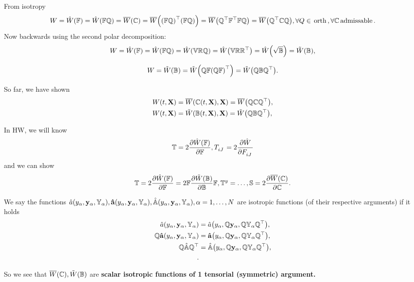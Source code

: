 \documentclass[reqno, a4paper]{article}
\begin{document}
From isotropy
\[
	W = \hat{W}\qty(\mathbb{F}) = \hat{W}\qty(\mathbb{F} \mathbb{Q}) = \overline{W}\qty(\mathbb{C}) = \overline{W}\qty(\qty(\mathbb{F} \mathbb{Q})^\top \qty(\mathbb{F} \mathbb{Q})) = \overline{W}\qty(\mathbb{Q}^\top \mathbb{F}^\top\mathbb{F} \mathbb{Q}) = \overline{W}\qty(\mathbb{Q}^\top\mathbb{C} \mathbb{Q}), \forall Q \in \, \text{orth} \,, \forall \mathbb{C} \, \text{admissable} \,.
\]
Now backwards using the second polar decomposition:
\[
	W = \hat{W}\qty(\mathbb{F}) = \hat{W}\qty(\mathbb{F} \mathbb{Q}) = \hat{W}\qty(\mathbb{V}\mathbb{R}\mathbb{Q}) = \hat{W}\qty(\mathbb{V}\mathbb{R}\mathbb{R}^\top) = \hat{W}\qty(\sqrt{\mathbb{B}}) = \tilde{W}\qty(\mathbb{B}),
\]

\[
	W = \tilde{W}\qty(\mathbb{B}) = \tilde{W}\qty(\mathbb{Q}\mathbb{F} \qty(\mathbb{Q}\mathbb{F})^\top) = \tilde{W}\qty(\mathbb{Q}\mathbb{B} \mathbb{Q}^\top).
\]

So far, we have shown
\begin{align*}
	W\qty(t,\vb{X}) &= \overline{W}\qty(\mathbb{C}\qty(t,\vb{X}),\vb{X}) = \overline{W}\qty(\mathbb{Q}\mathbb{C} \mathbb{Q}^\top), \\ W\qty(t,\vb{X}) &= \tilde{W}\qty(\mathbb{B}(t,\vb{X}), \vb{X}) = \tilde{W}\qty(\mathbb{Q} \mathbb{B} \mathbb{Q}^\top),
\end{align*}

In HW, we will know
\[
	\pkstress = 2 \pdv{\hat{W}\qty(\fgrad)}{\fgrad}, T \indices{_{iJ}} = 2 \pdv{\hat{W}}{F \indices{_{iJ}}}
\]
and we can show
\[
	\mathbb{T} = 2\pdv{\hat{W}\qty(\ensuremath{\mathbb{F}})}{\ensuremath{\mathbb{F}}} = 2 \mathbb{F} \pdv{\tilde{W}\qty(\ensuremath{\mathbb{B}})}{\ensuremath{\mathbb{B}}}\mathbb{F}, \mathbb{T}^y  = \dots, \mathbb{S} = 2 \pdv{\overline{W}\qty(\ensuremath{\mathbb{C}})}{\ensuremath{\mathbb{C}}}.
\]

\begin{definition}
	We say the functions $\hat{a}\qty(y_{\alpha}, \vb{y}_{\alpha}, \mathbb{Y}_{\alpha}), \vb{\hat{a}}\qty(y_{\alpha}, \vb{y}_{\alpha}, \mathbb{Y}_{\alpha}), \hat{\mathbb{A}}\qty(y_{\alpha},\vb{y}_{\alpha},\mathbb{Y}_{\alpha}), \alpha = 1, \dots, N$ are isotropic functions (of their respective arguments) if it holds
	\begin{align*}
		\hat{a}\qty(y_{\alpha}, \vb{y}_{\alpha}, \mathbb{Y}_{\alpha}) &= \hat{a}\qty(y_{\alpha}, \mathbb{Q}\vb{y}_{\alpha}, \mathbb{Q} \mathbb{Y}_{\alpha} \mathbb{Q}^\top), \\
		\mathbb{Q} \vb{\hat{a}}\qty(y_{\alpha}, \vb{y}_{\alpha}, \mathbb{Y}_{\alpha}) &= \vb{\hat{a}}\qty(y_{\alpha}, \mathbb{Q}\vb{y}_{\alpha}, \mathbb{Q}\mathbb{Y}_{\alpha}\mathbb{Q}^\top), \\
		\mathbb{Q}\hat{\mathbb{A}} \mathbb{Q}^\top &= \hat{\mathbb{A}}\qty(y_{\alpha}, \mathbb{Q}\vb{y}_{\alpha}, \mathbb{Q}\mathbb{Y}_{\alpha}\mathbb{Q}^\top), \\.
	\end{align*}
\end{definition}
So we see that $\overline{W}\qty(\mathbb{C}), \tilde{W}\qty(\mathbb{B})$ are \textbf{scalar isotropic functions of 1 tensorial (symmetric) argument.}
\end{document}
